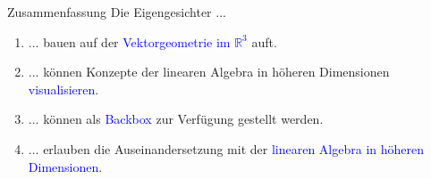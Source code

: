 \documentclass[10pt,aspectratio=169]{beamer}
\begin{document}
\begin{frame}[fragile]{Zusammenfassung}
	Die Eigengesichter ...\\
	\vspace{0.5cm}
	\begin{enumerate}[1.] \setlength\itemsep{0.5cm}
		\item ... bauen auf der \textcolor{blue}{Vektorgeometrie im $\mathbb R^3$} auft.
		\item ... können Konzepte der linearen Algebra in höheren Dimensionen \textcolor{blue}{visualisieren}.
		\item ... können als \textcolor{blue}{Backbox} zur Verfügung gestellt werden.
		\item ... erlauben die Auseinandersetzung mit der \textcolor{blue}{linearen Algebra in höheren Dimensionen}.
	\end{enumerate}
\end{frame}
\end{document}
